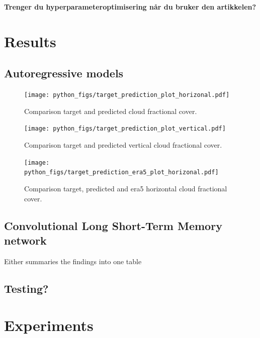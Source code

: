 \textbf{Trenger du hyperparameteroptimisering når du bruker den artikkelen?}

\section{Results}

\subsection{Autoregressive models}

\begin{figure}[ht]
    \centering
    \texttt{[image: python\_figs/target\_prediction\_plot\_horizonal.pdf]}
    \caption{Comparison target and predicted cloud fractional cover.}
    \label{fig:target_predict_horizontal}
\end{figure}

\begin{figure}[ht]
    \centering
    \texttt{[image: python\_figs/target\_prediction\_plot\_vertical.pdf]}
    \caption{Comparison target and predicted vertical cloud fractional cover.}
    \label{fig:target_predict_vertical}
\end{figure}

\begin{figure}[ht]
    \centering
    \texttt{[image: python\_figs/target\_prediction\_era5\_plot\_horizonal.pdf]}
    \caption{Comparison target, predicted and era5 horizontal cloud fractional cover.}
    \label{fig:target_predict_era5_vertical}
\end{figure}

\subsection{Convolutional Long Short-Term Memory network}
Either summaries the findings into one table 


\subsection{Testing?}

\section{Experiments}



